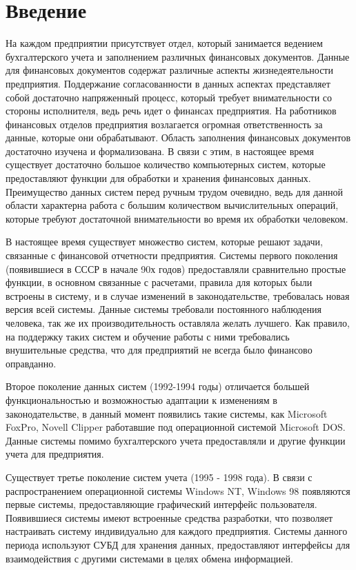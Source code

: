 \documentclass[14pt,a4paper]{reportmod}
\begin{document}
\chapter*{Введение}
На каждом предприятии присутствует отдел, который занимается ведением бухгалтерского учета и заполнением различных финансовых документов. Данные для финансовых документов содержат различные аспекты жизнедеятельности предприятия. Поддержание согласованности в данных аспектах представляет собой достаточно напряженный процесс, который требует внимательности со стороны исполнителя, ведь речь идет о финансах предприятия. На работников финансовых отделов предприятия возлагается огромная ответственность за данные, которые они обрабатывают. Область заполнения финансовых документов достаточно изучена и формализована. В связи с этим, в настоящее время существует достаточно большое количество компьютерных систем, которые предоставляют функции для обработки и хранения финансовых данных. Преимущество данных систем перед ручным трудом очевидно, ведь для данной области характерна работа с большим количеством вычислительных операций, которые требуют достаточной внимательности во время их обработки человеком.


В настоящее время существует множество систем, которые решают задачи, связанные с финансовой отчетности предприятия. Системы первого поколения (появившиеся в СССР в начале 90х годов)  предоставляли сравнительно простые функции, в основном связанные с расчетами, правила для которых были встроены в систему, и в случае изменений в законодательстве, требовалась новая версия всей системы. Данные системы требовали постоянного наблюдения человека, так же их производительность оставляла желать лучшего. Как правило, на поддержку таких систем и обучение работы с ними требовались внушительные средства, что для предприятий не всегда было финансово оправданно.

Второе поколение данных систем (1992-1994 годы) отличается большей функциональностью и возможностью адаптации к изменениям в законодательстве, в данный момент появились такие системы, как Microsoft FoxPro, Novell Clipper работавшие под операционной системой Microsoft DOS. Данные системы помимо бухгалтерского учета предоставляли и другие функции учета для предприятия.

Существует третье поколение систем учета (1995 - 1998 года). В связи с распространением операционной системы Windows NT, Windows 98 появляются первые системы, предоставляющие графический интерфейс пользователя. Появившиеся системы имеют встроенные средства разработки, что позволяет настраивать систему индивидуально для каждого предприятия. Системы данного периода используют СУБД для хранения данных, предоставляют интерфейсы для взаимодействия с другими системами в целях обмена информацией.
\end{document}
